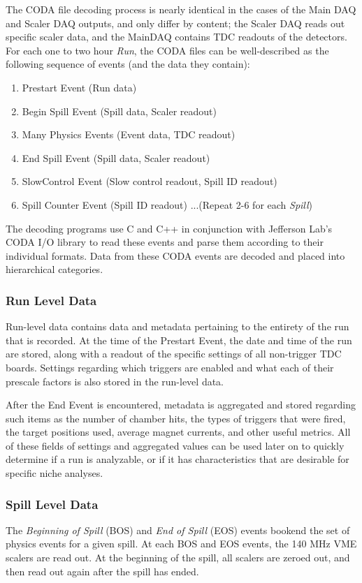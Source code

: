 The CODA file decoding process is nearly identical in the cases of the Main DAQ and Scaler DAQ outputs, and only differ by content; the Scaler DAQ reads out specific scaler data, and the MainDAQ contains TDC readouts of the detectors. For each one to two hour \emph{Run}, the CODA files can be well-described as the following sequence of events (and the data they contain):
\begin{enumerate}
	\item Prestart Event (Run data)
	\item Begin Spill Event (Spill data, Scaler readout)
	\item Many Physics Events (Event data, TDC readout)
	\item End Spill Event (Spill data, Scaler readout)
	\item SlowControl Event (Slow control readout, Spill ID readout)
	\item Spill Counter Event (Spill ID readout) \newline ...(Repeat 2-6 for each \emph{Spill})
\end{enumerate}

The decoding programs use C and C++ in conjunction with Jefferson Lab's CODA I/O library\cite{jlab:coda} to read these events and parse them according to their individual formats. Data from these CODA events are decoded and placed into hierarchical categories.

\subsubsection{Run Level Data}

Run-level data contains data and metadata pertaining to the entirety of the run that is recorded. At the time of the Prestart Event, the date and time of the run are stored, along with a readout of the specific settings of all non-trigger TDC boards. Settings regarding which triggers are enabled and what each of their prescale factors is also stored in the run-level data.

After the End Event is encountered, metadata is aggregated and stored regarding such items as the number of chamber hits, the types of triggers that were fired, the target positions used, average magnet currents, and other useful metrics. All of these fields of settings and aggregated values can be used later on to quickly determine if a run is analyzable, or if it has characteristics that are desirable for specific niche analyses.

\subsubsection{Spill Level Data}
The \emph{Beginning of Spill} (BOS) and \emph{End of Spill} (EOS) events bookend the set of physics events for a given spill. At each BOS and EOS events, the 140 MHz VME scalers are read out. At the beginning of the spill, all scalers are zeroed out, and then read out again after the spill has ended.

